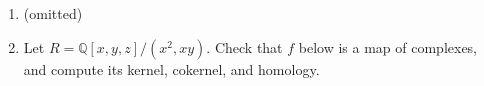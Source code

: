 \documentclass[11pt,oneside,english]{amsart}
\theoremstyle{definition}
\newcommand{\MB}[1]{\mathbb{#1}}
\newcommand{\im}{\text{im\,}}
\newcommand{\coker}{\text{coker\,}}
\begin{document}
\begin{enumerate}[leftmargin=*]
\begin{proof}
Observe:
\begin{align*}
H_1(A)&=\frac{\ker f}{\im(\ker f)}=\frac{\ker f}{0}=\ker f & H_0(A)&=\frac{\ker(A_0\to\coker f)}{\im f}=\frac{A_0}{\im f}=\coker f \\[2mm]
H_1(B)&=\frac{\ker g}{\im(\ker g)}=\frac{\ker g}{0}=\ker g & H_0(B)&=\frac{\ker(B_0\to\coker g)}{\im g}=\frac{B_0}{\im g}=\coker g \\[2mm]
H_1(C)&=\frac{\ker h}{\im(\ker h)}=\frac{\ker h}{0}=\ker h & H_0(C)&=\frac{\ker(C_0\to\coker h)}{\im h}=\frac{C_0}{\im h}=\coker h \\[2mm]
\end{align*}
So the exact sequence above is
\begin{center}
\end{center}
\end{proof}

\pagebreak

\item (omitted)

\item Let $R=\MB{Q}[x,y,z]/(x^2,xy)$. Check that $f$ below is a map of complexes, and compute its kernel, cokernel, and homology.


\end{enumerate}
\end{document}
